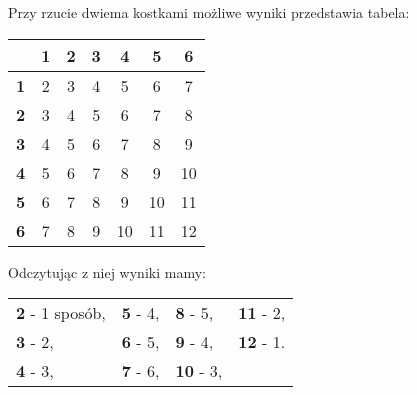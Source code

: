 
\medskip
{} 
\medskip

Przy rzucie dwiema kostkami możliwe wyniki przedstawia tabela:\\
\begin{table}[htb]
\centering
\begin{tabular}{|c|c|c|c|c|c|c|}
\hline
 & \textbf{1} & \textbf{2} & \textbf{3} & \textbf{4} & \textbf{5} & \textbf{6} \\
\hline
\textbf{1} & 2 & 3 & 4 & 5 & 6 & 7 \\
\hline
\textbf{2} & 3 & 4 & 5 & 6 & 7 & 8 \\
\hline
\textbf{3} & 4 & 5 & 6 & 7 & 8 & 9 \\
\hline
\textbf{4} & 5 & 6 & 7 & 8 & 9 & 10 \\
\hline
\textbf{5} & 6 & 7 & 8 & 9 & 10 & 11 \\
\hline
\textbf{6} & 7 & 8 & 9 & 10 & 11 & 12 \\
\hline
\end{tabular}
\end{table}

Odczytując z niej wyniki mamy:\\

\begin{tabular}{llll}
\textbf{2} - 1 sposób, & \textbf{5} - 4, & \textbf{8} - 5, & \textbf{11} - 2, \\
\textbf{3} - 2, & \textbf{6} - 5, & \textbf{9} - 4, & \textbf{12} - 1. \\
\textbf{4} - 3, & \textbf{7} - 6, & \textbf{10} - 3, & \\
\end{tabular}
\\
\\
